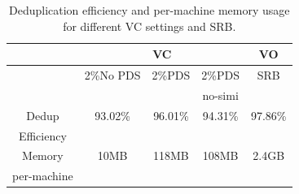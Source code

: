 \begin{table}[htb]
\centering
    \begin{tabular}{|c|c|c|c|c|}
    \hline 
&
     \multicolumn{3}{|c|}{VC}  & VO \\ \hline
&
     2\%No PDS &2\%PDS     & 2\%PDS & SRB  \\ 
&        &&     no-simi & \\ \hline
Dedup &      93.02\%  & 96.01\% & 94.31\% & 97.86\% \\ 
Efficiency &          &       &           &      \\    \hline 
Memory &      10MB & 118MB  & 108MB & 2.4GB \\ 
per-machine &      &   &  &  \\ \hline
    \end{tabular}
    \caption{Deduplication efficiency and per-machine memory usage for different VC settings and
        SRB.}
    \label{tab:efficiency-comparison}
\end{table}


